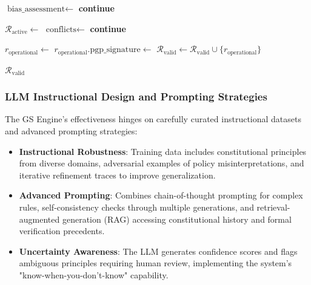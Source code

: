 \documentclass[sigconf,natbib]{acmart}
\begin{document}
\begin{algorithm}[!htbp]
\begin{algorithmic}[1]
    \State $\text{bias\_assessment} \gets$ 
     
      \State {}
      \State \textbf{continue}
    \EndIf

    \State $\mathcal{R}_{\text{active}} \gets$ 
    \State $\text{conflicts} \gets$ 
      \State {}
      \State \textbf{continue}
    \EndIf

    \State $r_{\text{operational}} \gets$ 
    \State $r_{\text{operational}}.\text{pgp\_signature} \gets$ 
    \State $\mathcal{R}_{\text{valid}} \gets \mathcal{R}_{\text{valid}} \cup \{r_{\text{operational}}\}$
  \EndFor

  \State \Return $\mathcal{R}_{\text{valid}}$
\EndFunction
\end{algorithmic}
\end{algorithm}

\subsubsection{LLM Instructional Design and Prompting Strategies}
The GS Engine's effectiveness hinges on carefully curated instructional datasets and advanced prompting strategies:
\begin{itemize}
    \item \textbf{Instructional Robustness}: Training data includes constitutional principles from diverse domains, adversarial examples of policy misinterpretations, and iterative refinement traces to improve generalization.
    \item \textbf{Advanced Prompting}: Combines chain-of-thought prompting for complex rules, self-consistency checks through multiple generations, and retrieval-augmented generation (RAG) accessing constitutional history and formal verification precedents.
    \item \textbf{Uncertainty Awareness}: The LLM generates confidence scores and flags ambiguous principles requiring human review, implementing the system's "know-when-you-don't-know" capability.
\end{itemize}
\end{document}
